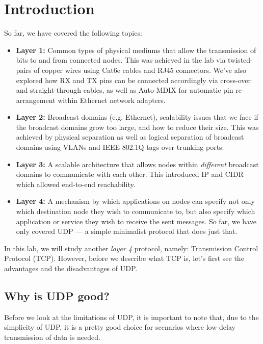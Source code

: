\documentclass[pdftex,12pt,a4paper]{article}
\begin{document}
    \section{Introduction}
        So far, we have covered the following topics:
        \begin{itemize}
            \item \textbf{Layer 1:} Common types of physical mediums that
                allow the transmission of bits to and from connected nodes.
                This was achieved in the lab via twisted-pairs of copper wires
                using Cat6e cables and RJ45 connectors. We've also explored how
                RX and TX pins can be connected accordingly via cross-over and
                straight-through cables, as well as Auto-MDIX for automatic pin
                re-arrangement within Ethernet network adapters.

            \item \textbf{Layer 2:} Broadcast domains (e.g. Ethernet),
                scalability issues that we face if the broadcast domains grow
                too large, and how to reduce their size.  This was achieved by
                physical separation as well as logical separation of broadcast
                domains using VLANs and IEEE 802.1Q tags over trunking ports.

            \item \textbf{Layer 3:} A scalable architecture that allows nodes
                within \emph{different} broadcast domains to communicate with
                each other. This introduced IP and CIDR which allowed
                end-to-end reachability.

            \item \textbf{Layer 4:} A mechanism by which applications on nodes
                can specify not only which destination node they wish to
                communicate to, but also specify which application or service
                they wish to receive the sent messages. So far, we have only
                covered UDP --- a simple minimalist protocol that does just
                that.
        \end{itemize}

        In this lab, we will study another \emph{layer 4} protocol, namely:
        Transmission Control Protocol (TCP). However, before we describe what
        TCP is, let's first see the advantages and the disadvantages of UDP.

        \subsection{Why is UDP good?}
            Before we look at the limitations of UDP, it is important to note
            that, due to the simplicity of UDP, it is a pretty good choice for
            scenarios where low-delay transmission of data is needed. 
            
\end{document}
